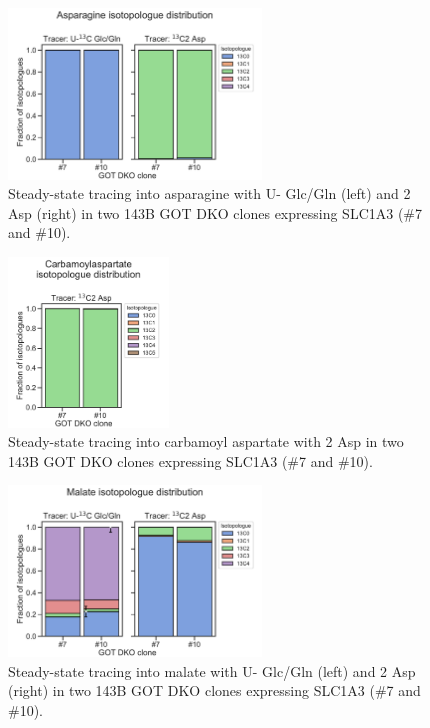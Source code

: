 \begin{figure}[ht]
    \centering
    \includegraphics[width=0.6\textwidth]{figures/sapp/DKO_char/143B_Asn_iso_dist.pdf}
    \caption[\hCi{} Gln/Glc, Asp tracing in 143B GOT DKO, Asn.]{
    Steady-state tracing into asparagine with U-\hCi{} Glc/Gln (left) and \hCi{}2 Asp (right) in two 143B GOT DKO clones expressing SLC1A3 (\#7 and \#10).
    }
    \label{fig:sapp:DKO_char:143B_Asn_iso_dist}
\end{figure}

\begin{figure}[ht]
    \centering
    \includegraphics[width=0.38\textwidth]{figures/sapp/DKO_char/143B_CarbAsp_iso_dist.pdf}
    \caption[\hCi{} Asp tracing in 143B GOT DKO, Carbamoyl Asp.]{
    Steady-state tracing into carbamoyl aspartate with \hCi{}2 Asp in two 143B GOT DKO clones expressing SLC1A3 (\#7 and \#10).
    }
    \label{fig:sapp:DKO_char:143B_CarbAsp_iso_dist}
\end{figure}

\begin{figure}[ht]
    \centering
    \includegraphics[width=0.6\textwidth]{figures/sapp/DKO_char/143B_Mal_iso_dist.pdf}
    \caption[\hCi{} Gln/Glc, Asp tracing in 143B GOT DKO, Malate.]{
    Steady-state tracing into malate with U-\hCi{} Glc/Gln (left) and \hCi{}2 Asp (right) in two 143B GOT DKO clones expressing SLC1A3 (\#7 and \#10).
    }
    \label{fig:sapp:DKO_char:143B_Mal_iso_dist}
\end{figure}






